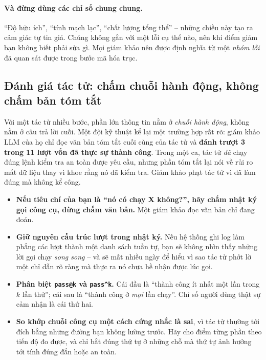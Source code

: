 \paragraph{Và đừng dùng các chỉ số chung chung.} “Độ hữu ích”, “tính mạch lạc”, “chất lượng tổng thể” -- những chiều này tạo ra cảm giác tự tin giả. Chúng không gắn với một lỗi cụ thể nào, nên khi điểm giảm bạn không biết phải sửa gì. Mọi giám khảo nên được định nghĩa từ một \emph{nhóm lỗi} đã quan sát được trong bước mã hóa trục.

\subsection{Đánh giá tác tử: chấm chuỗi hành động, không chấm bản tóm tắt}
\label{ssec:agent_eval}

Với một tác tử nhiều bước, phần lớn thông tin nằm ở \emph{chuỗi hành động}, không nằm ở câu trả lời cuối. Một đội kỹ thuật kể lại một trường hợp rất rõ: giám khảo LLM của họ chỉ đọc văn bản tóm tắt cuối cùng của tác tử và \textbf{đánh trượt 3 trong 11 lượt vốn đã thực sự thành công}. Trong một ca, tác tử \emph{đã} chạy đúng lệnh kiểm tra an toàn được yêu cầu, nhưng phần tóm tắt lại nói về rủi ro mất dữ liệu thay vì khoe rằng nó đã kiểm tra. Giám khảo phạt tác tử vì đã làm đúng mà không kể công.

\begin{itemize}
	\item \textbf{Nếu tiêu chí của bạn là “nó có chạy X không?”, hãy chấm nhật ký gọi công cụ, đừng chấm văn bản.} Một giám khảo đọc văn bản chỉ đang đoán.
	\item \textbf{Giữ nguyên cấu trúc lượt trong nhật ký.} Nếu hệ thống ghi log làm phẳng các lượt thành một danh sách tuần tự, bạn sẽ không nhìn thấy những lời gọi chạy \emph{song song} -- và sẽ mất nhiều ngày để hiểu vì sao tác tử phớt lờ một chỉ dẫn rõ ràng mà thực ra nó chưa hề nhận được lúc gọi.
	\item \textbf{Phân biệt \texttt{pass@k} và \texttt{pass\^{}k}.} Cái đầu là “thành công ít nhất một lần trong $k$ lần thử”; cái sau là “thành công ở \emph{mọi} lần chạy”. Chỉ số người dùng thật sự cảm nhận là cái thứ hai.
	\item \textbf{So khớp chuỗi công cụ một cách cứng nhắc là sai}, vì tác tử thường tới đích bằng những đường bạn không lường trước. Hãy cho điểm từng phần theo tiến độ đo được, và chỉ bắt đúng thứ tự ở những chỗ mà thứ tự ảnh hưởng tới tính đúng đắn hoặc an toàn.
\end{itemize}

